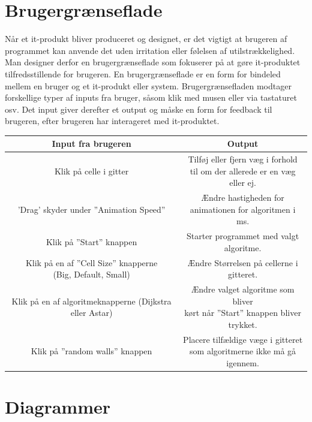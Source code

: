\documentclass[12pt]{article}
\begin{document}
\section{Brugergrænseflade}
Når et it-produkt bliver produceret og designet, er det vigtigt at brugeren af programmet kan anvende det uden irritation eller følelsen af utilstrækkelighed. Man designer derfor en brugergrænseflade som fokuserer på at gøre it-produktet tilfredsstillende for brugeren.
En brugergrænseflade er en form for bindeled mellem en bruger og et it-produkt eller system. Brugergrænsefladen modtager forskellige typer af inputs fra bruger, såsom klik med musen eller via tastaturet osv. Det input giver derefter et output og måske en form for feedback til brugeren, efter brugeren har interageret med it-produktet. 
\begin{table}[ht]
  {\renewcommand{\arraystretch}{1.2} %
  \begin{tabular}{ |c|c| }
   \hline
   \textbf{Input fra brugeren} & \textbf{Output} \\ 
   \hline
   Klik på celle i gitter & \shortstack{Tilføj eller fjern væg i forhold \\ til om der allerede er en væg eller ej.} \\
   \hline
   ’Drag’ skyder under ”Animation Speed” & \shortstack{Ændre hastigheden for \\ animationen for algoritmen i ms.} \\
   \hline
   Klik på ”Start” knappen & Starter programmet med valgt algoritme. \\
   \hline
   \shortstack{Klik på en af ”Cell Size” knapperne \\(Big, Default, Small)} & Ændre Størrelsen på cellerne i gitteret. \\
   \hline
   Klik på en af algoritmeknapperne (Dijkstra eller Astar) & \shortstack{Ændre valget algoritme som bliver \\kørt når ”Start” knappen bliver trykket.} \\
   \hline
   Klik på ”random walls” knappen & \shortstack{Placere tilfældige væge i gitteret \\ som algoritmerne ikke må gå igennem.} \\
   \hline
  \end{tabular}}
\end{table}
\section{Diagrammer}
\end{document}
